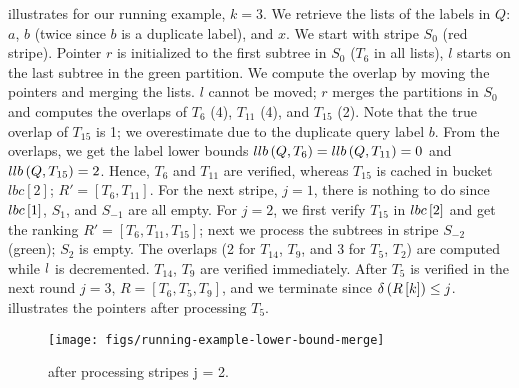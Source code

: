 \begin{example}

 illustrates \lowerboundmerge{} for our running example, $k = 3$. We retrieve the lists of the labels in $Q$: $a$, $b$ (twice since $b$ is a duplicate label), and $x$. We start with stripe $S_0$ (red stripe). Pointer $r$ is initialized to the first subtree in $S_0$ ($T_6$ in all lists), $l$ starts on the last subtree in the green partition.
%
We compute the overlap by moving the pointers and merging the lists. $l$ cannot be moved; $r$ merges the partitions in $S_0$ and computes the overlaps of $T_6$ (4), $T_{11}$ (4), and $T_{15}$ (2). Note that the true overlap of $T_{15}$ is 1; we overestimate due to the duplicate query label $b$. From the overlaps, we get the label lower bounds $llb \left( Q, T_6 \right) = llb \left( Q, T_{11} \right) = 0$ and $llb \left( Q, T_{15} \right) = 2$.
%
Hence, $T_6$ and $T_{11}$ are verified, whereas $T_{15}$ is cached in bucket $lbc[2]$; $R' = \left[ T_6, T_{11} \right]$. For the next stripe, $j = 1$, there is nothing to do since $lbc\left[ 1 \right]$, $S_{1}$, and $S_{-1}$ are all empty.
%
For $j = 2$, we first verify $T_{15}$ in $lbc\left[ 2 \right]$ and get the ranking $R' = \left[ T_6, T_{11}, T_{15} \right]$; next we process the subtrees in stripe $S_{-2}$ (green); $S_2$ is empty. The overlaps (2 for $T_{14}$, $T_9$, and 3 for $T_5$, $T_2$) are computed while $l{}$ is decremented. $T_{14}$, $T_9$ are verified immediately.
%
After $T_5$ is verified in the next round $j = 3$, $R = \left[ T_6, T_5, T_9 \right]$, and we terminate since $\delta \left( R\left[ k \right] \right) \leq j$.  illustrates the pointers after processing $T_5$.

\begin{figure}[ht!]
  \centering
  \texttt{[image: figs/running-example-lower-bound-merge]}
  \caption{\lowerboundmerge{} after processing stripes j = 2.}
  \label{fig:running-example-lower-bound-merge}
\end{figure}

\end{example}
